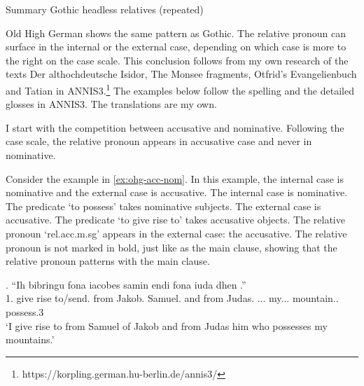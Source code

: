 \begin{table}[H]
  \center
  \caption{Summary Gothic headless relatives (repeated)}
    
    \label{tbl:summary-gothic-repeated}
\end{table}

%
%


Old High German shows the same pattern as Gothic. The relative pronoun can surface in the internal or the external case, depending on which case is more to the right on the case scale. This conclusion follows from my own research of the texts Der althochdeutsche Isidor, The Monsee fragments, Otfrid's Evangelienbuch and Tatian in ANNIS3.\footnote{
https://korpling.german.hu-berlin.de/annis3/
} The examples below follow the spelling and the detailed glosses in ANNIS3. The translations are my own.

I start with the competition between accusative and nominative. Following the case scale, the relative pronoun appears in accusative case and never in nominative.

Consider the example in \ref{ex:ohg-acc-nom}. In this example, the internal case is nominative and the external case is accusative.
The internal case is nominative. The predicate  `to possess' takes nominative subjects.
The external case is accusative. The predicate  `to give rise to' takes accusative objects.
The relative pronoun  `\ac{rel}.\ac{acc}.\ac{m}.\ac{sg}' appears in the external case: the accusative. The relative pronoun is not marked in bold, just like as the main clause, showing that the relative pronoun patterns with the main clause.


\exg. ``Ih bibringu fona iacobes samin endi fona iuda dhen   .''\\
1. {give rise to/send}.\scsub{[acc]} from Jakob. Samuel. and from Judas. ... my... mountain.. possess.3\scsub{[nom]}\\
`I give rise to from Samuel of Jakob and from Judas him who possesses my mountains.' \label{ex:ohg-acc-nom}\\

